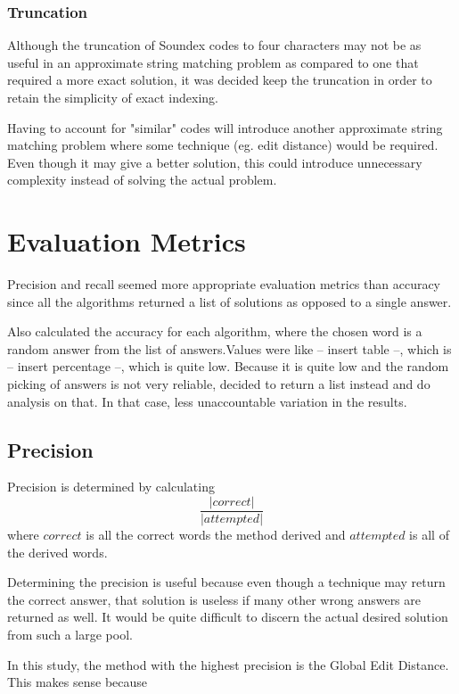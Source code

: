 \documentclass[11pt]{article}
\begin{document}
\subsubsection{Truncation}
Although the truncation of Soundex codes to four characters may not be as useful in an approximate string matching problem as compared to one that required a more exact solution, it was decided keep the truncation in order to retain the simplicity of exact indexing. 

Having to account for "similar" codes will introduce another approximate string matching problem where some technique (eg. edit distance) would be required. Even though it may give a better solution, this could introduce unnecessary complexity instead of solving the actual problem. %

\section{Evaluation Metrics}  %
Precision and recall seemed more appropriate evaluation metrics than accuracy since all the algorithms returned a list of solutions as opposed to a single answer.  

Also calculated the accuracy for each algorithm, where the chosen word is a random answer from the list of answers.Values were like -- insert table --, which is -- insert percentage --, which is quite low. Because it is quite low and the random picking of answers is not very reliable, decided to return a list instead and do analysis on that. In that case, less unaccountable variation in the results.

\subsection{Precision}
Precision is determined by calculating 
\begin{equation}\frac{|correct|}{|attempted|}\end{equation}
where \(correct\) is all the correct words the method derived and \(attempted\) is all of the derived words. 

Determining the precision is useful because even though a technique may return the correct answer, that solution is useless if many other wrong answers are returned as well. It would be quite difficult to discern the actual desired solution from such a large pool.

In this study, the method with the highest precision is the Global Edit Distance. This makes sense because 
\end{document}
